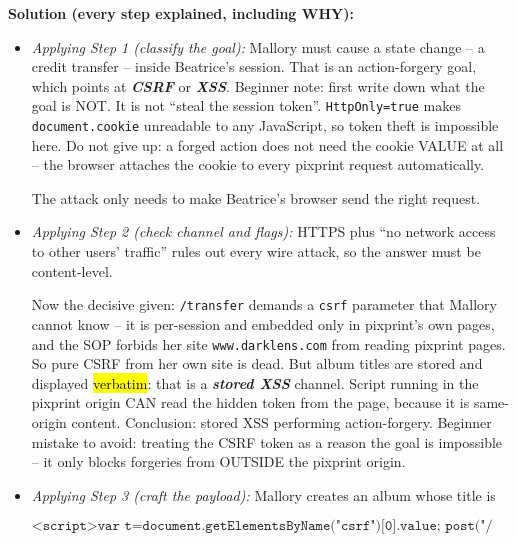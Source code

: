 \documentclass[12pt, a4paper]{article}
\newcommand{\term}[1]{\textbf{\textit{#1}}}        %
\newcommand{\imp}[1]{\hl{#1}}                       %
\begin{document}
\textbf{Solution (every step explained, including WHY):}
\begin{itemize}
    \item \textit{Applying Step 1 (classify the goal):} Mallory must cause a state change -- a credit transfer -- inside Beatrice's session. That is an action-forgery goal, which points at \term{CSRF} or \term{XSS}.
    Beginner note: first write down what the goal is NOT. It is not ``steal the session token''. \texttt{HttpOnly=true} makes \texttt{document.cookie} unreadable to any JavaScript, so token theft is impossible here.
    Do not give up: a forged action does not need the cookie VALUE at all -- the browser attaches the cookie to every pixprint request automatically.

    The attack only needs to make Beatrice's browser send the right request.
    \item \textit{Applying Step 2 (check channel and flags):} HTTPS plus ``no network access to other users' traffic'' rules out every wire attack, so the answer must be content-level.

    Now the decisive given: \texttt{/transfer} demands a \texttt{csrf} parameter that Mallory cannot know -- it is per-session and embedded only in pixprint's own pages, and the SOP forbids her site \texttt{www.darklens.com} from reading pixprint pages.
    So pure CSRF from her own site is dead. But album titles are stored and displayed \imp{verbatim}: that is a \term{stored XSS} channel.
    Script running in the pixprint origin CAN read the hidden token from the page, because it is same-origin content.
    Conclusion: stored XSS performing action-forgery. Beginner mistake to avoid: treating the CSRF token as a reason the goal is impossible -- it only blocks forgeries from OUTSIDE the pixprint origin.
    \item \textit{Applying Step 3 (craft the payload):} Mallory creates an album whose title is

\[
\texttt{<script>var t=document.getElementsByName("csrf")[0].value; post("/transfer", "to=mallory,amount=200,csrf="+t)</script>}
\]


\end{itemize}
\end{document}
